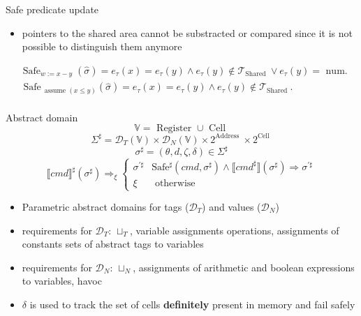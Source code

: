 \documentclass[aspectratio=169]{beamer}
\begin{document}
\begin{frame}{Safe predicate update}
\begin{itemize}
  \item pointers to the shared area cannot be substracted or compared
  since it is not possible to distinguish them anymore
\end{itemize}

$$
\begin{aligned}
& \operatorname{Safe}_{w:=x-y}(\widehat{\sigma})=  e_\tau(x)=e_\tau(y) \wedge e_\tau(y) \notin \mathcal{T}_{\text {Shared }}  \vee e_\tau(y)=\text { num. } \\
& \text { Safe }_{\text {assume }(x \leq y)}(\widehat{\sigma})=  e_\tau(x)=e_\tau(y) \wedge e_\tau(y) \notin \mathcal{T}_{\text {Shared }} .\\
\end{aligned}
$$
\end{frame}

\begin{frame}{Abstract domain}
  $$\mathbb{V}=\text { Register } \cup \text { Cell } $$
  $$ \Sigma^{\sharp} = \mathcal{D}_T ( \mathbb{V} ) \times \mathcal{D}_N (\mathbb{V}) \times 2^{\text {Address }} \times 2^{\text {Cell }}$$
  $$\sigma^{\sharp}=(\theta, d, \zeta, \delta) \in \Sigma^{\sharp} $$
  $$ \llbracket c m d \rrbracket^{\sharp}(\sigma^{\sharp}) \Rightarrow_{\xi} \begin{cases}\sigma^{\prime \sharp} & \mathrm{Safe^{\sharp}}(c m d, \sigma^{\sharp}) \wedge\llbracket c m d^{\sharp} \rrbracket (\sigma^{\sharp}) \Rightarrow \sigma^{\prime \sharp} \\ \xi & \text { otherwise }\end{cases} $$

\begin{itemize}
\item Parametric abstract domains for tags ($\mathcal{D}_T$) and values ($\mathcal{D}_N$)
\item requirements for $\mathcal{D}_T$: $\sqcup_T$, variable assignments operations, assignments of constants sets of abstract
tags to variables
\item requirements for $\mathcal{D}_N$: $\sqcup_N$, assignments of arithmetic and boolean expressions to variables, havoc
\item $\delta$ is used to track the set of cells \textbf{definitely} present in memory and fail safely
\end{itemize}
\end{frame}
\end{document}
